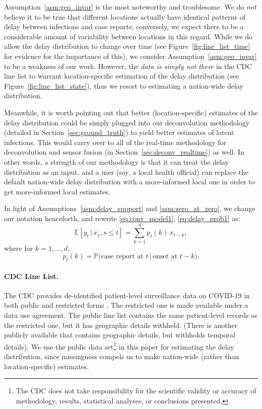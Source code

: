 \documentclass[sts]{imsart}
\def\E{\mathbb{E}}
\def\P{\mathbb{P}}
\theoremstyle{plain}
\theoremstyle{definition}
\theoremstyle{remark}
\begin{document}
Assumption~\ref{asm:geo_invar} is the most noteworthy and troublesome. We do
\emph{not} believe it to be true that different locations actually have
identical patterns of delay between infections and case reports; conversely, we
expect there to be a considerable amount of variability between locations in
this regard. While we do allow the delay distribution to change over time (see
Figure~\ref{fig:line_list_time} for evidence for the importance of this), we
consider Assumption~\ref{asm:geo_invar} to be a weakness of our work. However,
the \emph{data is simply not there} in the CDC line list to warrant
location-specific estimation of the delay distribution (see
Figure~\ref{fig:line_list_state}), thus we resort to estimating a nation-wide
delay distribution.

Meanwhile, it is worth pointing out that better (location-specific) estimates of
the delay distribution could be simply plugged into our deconvolution
methodology (detailed in Section~\ref{sec:ground_truth}) to yield better
estimates of latent infections. This would carry over to all of the real-time  
methodology for deconvolution and sensor fusion (in
Section~\ref{sec:deconv_realtime}) as well. In other words, a strength of our
methodology is that it can treat the delay distribution as an input, and a user
(say, a local health official) can replace the default nation-wide delay
distribution with a more-informed local one in order to get more-informed local 
estimates. 

In light of Assumptions~\ref{asm:delay_support} and \ref{asm:zero_at_zero}, we
change our notation henceforth, and rewrite \eqref{eq:conv_model1},
\eqref{eq:delay_prob1} as: 
\begin{equation}
\label{eq:conv_model2}
\E[y_t \,|\, x_s, s \leq t] = \sum_{k=1}^d p_t(k) \, x_{t-k},  
\end{equation}
where for $k=1,\ldots,d$,
\begin{equation}
\label{eq:delay_prob2}
p_t(k) = \P\big( \text{case report at $t$} \,|\, \text{onset at $t-k$} \big). 
\end{equation}

\smallskip
\paragraph*{CDC Line List.}

The CDC provides de-identified patient-level surveillance data on COVID-19 in
both public and restricted forms \citep{cdc_public, cdc_restricted}. The
restricted one is made available under a data use agreement. The public line
list contains the same patient-level records as the restricted one, but it has
geographic details withheld. (There is another publicly available that contains
geographic details, but withholds temporal details). We use the public data
set\footnote{The CDC does not take responsibility for the scientific validity or
  accuracy of methodology, results, statistical analyses, or conclusions
  presented.} 
in this paper for estimating the delay distribution, since missingness compels
us to make nation-wide (rather than location-specific) estimates.
\end{document}
